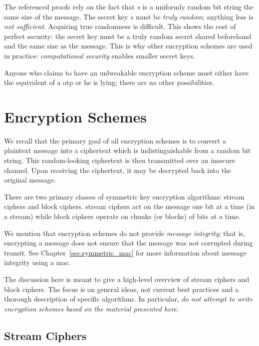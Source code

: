 The referenced proofs rely on the fact that $s$ is a uniformly
random bit string the same size of the message.
The secret key $s$ must be \emph{truly random};
anything less is \emph{not sufficient}.
Acquiring true randomness is difficult.
This shows the cost of \gls{perfect security}:
the secret key must be a truly random secret shared beforehand
and the same size as the message.
This is why other \glspl{encryption scheme} are used in practice:
\emph{computational security} enables smaller secret keys.

Anyone who claims to have an unbreakable \gls{encryption scheme} must
either have the equivalent of a \gls{otp} or he is lying;
there are no other possibilities.



\section{Encryption Schemes}

We recall that the primary goal of all \glspl{encryption scheme}
is to convert a plaintext message into a ciphertext which
is indistinguishable from a random bit string.
This random-looking ciphertext is then transmitted over
an \gls{insecure channel}.
Upon receiving the ciphertext, it may be decrypted back into
the original message.

There are two primary classes of \gls{symmetric key encryption} algorithms:
\glspl{stream cipher} and \glspl{block cipher}.
\Glspl{stream cipher} act on the message one bit at a time (in a stream)
while \glspl{block cipher} operate on chunks (or blocks) of bits at a time.

We mention that \glspl{encryption scheme} do not provide
\emph{message integrity};
that is, encrypting a message does not ensure that the message was
not corrupted during transit.
See Chapter~\ref{sec:symmetric_mac} for more information
about message integrity using a \gls{mac}.

The discussion here is meant to give a high-level overview
of \glspl{stream cipher} and \glspl{block cipher}.
The focus is on general ideas,
not current best practices and a thorough description of specific algorithms.
In particular, \emph{do not attempt to write \glspl{encryption scheme}
based on the material presented here.}


\subsection{Stream Ciphers}
\label{ssec:stream_cipher}

